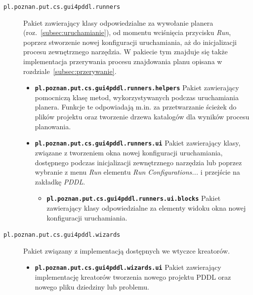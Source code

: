 \begin{description}
\begin{itemize}
\end{itemize}
\item [\texttt{pl.poznan.put.cs.gui4pddl.runners}] Pakiet zawierający klasy odpowiedzialne za wywołanie planera (roz.~\ref{subsec:uruchamianie}), od momentu wciśnięcia przycisku \textit{Run}, poprzez stworzenie nowej konfiguracji uruchamiania, aż do inicjalizacji procesu zewnętrznego narzędzia. W pakiecie tym znajduje się także implementacja przerywania procesu znajdowania planu opisana w rozdziale~\ref{subsec:przerywanie}.
\begin{itemize}
\item \texttt{\textbf{pl.poznan.put.cs.gui4pddl.runners.helpers}} Pakiet zawierający pomocniczą klasę metod, wykorzystywanych podczas uruchamiania planera. Funkcje te odpowiadają m.in. za przetwarzanie ścieżek do plików projektu oraz tworzenie drzewa katalogów dla wyników procesu planowania.
\item \texttt{\textbf{pl.poznan.put.cs.gui4pddl.runners.ui}} Pakiet zawierający klasy, związane z tworzeniem okna nowej konfiguracji uruchamiania, dostępnego podczas inicjalizacji zewnętrznego narzędzia lub poprzez wybranie z menu \textit{Run} elementu \textit{Run Configurations...} i przejście na zakładkę \textit{PDDL}.
\begin{itemize}
\item \texttt{\textbf{pl.poznan.put.cs.gui4pddl.runners.ui.blocks}} Pakiet zawierający klasy odpowiedzialne za elementy widoku okna nowej konfiguracji uruchamiania.
\end{itemize}
\end{itemize}
\item [\texttt{pl.poznan.put.cs.gui4pddl.wizards}] Pakiet związany z implementacją dostępnych we wtyczce kreatorów.
\begin{itemize}
\item \texttt{\textbf{pl.poznan.put.cs.gui4pddl.wizards.ui}} Pakiet zawierający implementację kreatorów tworzenia nowego projektu PDDL oraz nowego pliku dziedziny lub problemu.
\end{itemize}
\end{description}